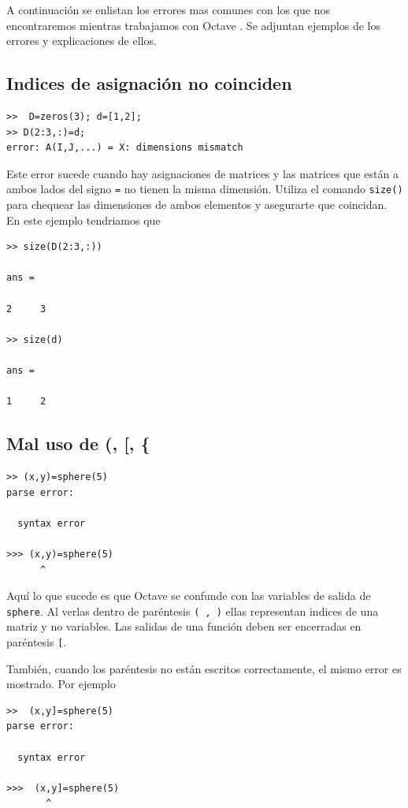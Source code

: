 \documentclass[letter,11pt]{article}
\newcommand\0{\mathbf{0}}
\newcommand{\octave}{{\sc Octave }}
\begin{document}
A continuaci\'on se enlistan los errores mas comunes con los que nos encontraremos mientras trabajamos con \octave. Se adjuntan ejemplos de los errores y explicaciones de ellos.

\subsection{Indices de asignaci\'on no coinciden}
\begin{lstlisting}
>>  D=zeros(3); d=[1,2];
>> D(2:3,:)=d;
error: A(I,J,...) = X: dimensions mismatch
\end{lstlisting}
Este error sucede cuando hay asignaciones de matrices  y las matrices que est\'an a ambos lados del signo \texttt{=} no tienen la misma dimensi\'on. Utiliza el comando \texttt{size()} para 
chequear las dimensiones de ambos elementos y asegurarte que coincidan. En este 
ejemplo tendriamos que
\begin{lstlisting}
>> size(D(2:3,:))

ans =

2     3

>> size(d)

ans =

1     2
\end{lstlisting}

\subsection{Mal uso de (, [, \{}
\begin{lstlisting}
>> (x,y)=sphere(5)
parse error:

  syntax error

>>> (x,y)=sphere(5)
      ^
\end{lstlisting}
Aqu\'i lo que sucede es que \octave se confunde con las variables de salida de \texttt{sphere}. Al verlas dentro de par\'entesis \verb"( , )" ellas representan indices de una matriz y no variables. Las salidas de una  funci\'on  deben ser encerradas en par\'entesis \verb"[". 

Tambi\'en, cuando los par\'entesis no est\'an escritos correctamente, el mismo error es mostrado. Por ejemplo
\begin{lstlisting} 
>>  (x,y]=sphere(5)
parse error:

  syntax error

>>>  (x,y]=sphere(5)
       ^
\end{lstlisting}
\end{document}
